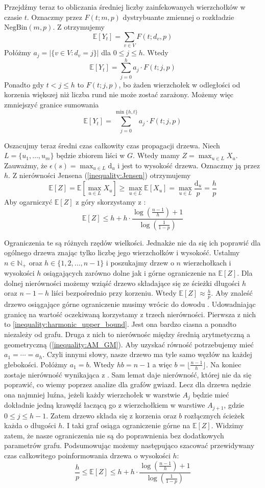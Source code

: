 Przejdźmy teraz to obliczania średniej liczby zainfekowanych wierzchołków w czasie $t$. Oznaczmy przez $F(t;m,p)$ dystrybuante zmiennej o rozkładzie $\mathrm{NegBin}(m,p)$. Z  otrzymujemy
\[
    \mathbb{E}[Y_t] = \sum_{v\in V} F(t; d_v, p)
\]
Połóżmy $a_j = |\{v\in V: d_v=j\}|$ dla $0\le j \le h$. Wtedy 
\[
    \mathbb{E}[Y_t] = \sum_{j=0}^{h} a_j\cdot F(t; j, p)
\]
Ponadto gdy $t<j\le h$ to $F(t; j, p)$, bo żaden wierzchołek w odległości od korzenia większej niż liczba rund nie może zostać zarażony. Możemy więc zmniejszyć granice sumowania 
\[
    \mathbb{E}[Y_t] = \sum_{j=0}^{\min\{h,t\}} a_j\cdot F(t; j, p)
\]

Oszacujmy teraz średni czas całkowity czas propagacji drzewa.
Niech $L=\{u_1,\dots, u_m\}$ będzie zbiorem liści w $G$. Wtedy mamy $Z = \max_{u\in L} X_{u}$.
Zauważmy, że $\epsilon(s) = \max_{u\in L} \mathrm{d}_{u}$ i jest to wysokość drzewa. Oznaczmy ją przez $h$. Z nierówności Jensena (\ref{inequality:Jensen}) otrzymujemy
\[
    \mathbb{E}[Z]=\mathbb{E}[\max_{u\in L} X_{u}] \ge \max_{u\in L} \mathbb{E}[X_{u}] = \max_{u\in L} \frac{\mathrm{d}_{u}}{p} = \frac{h}{p}
\]
Aby ogarniczyć $\mathbb{E}[Z]$ z góry skorzystamy z :
\[
    \mathbb{E}[Z] \le h  + h \cdot \frac{\log(\frac{n-1}{h}) + 1}{\log(\frac{1}{1-p})}
\]

Ograniczenia te są różnych rzędów wielkości. Jednakże nie da się ich poprawić dla ogólnego drzewa znając tylko liczbę jego wierzchołków i wysokość. Ustalmy $n\in\mathbb{N}_+$ oraz $h\in\{1,2,\dots,n-1\}$ i poszukajmy drzew o $n$ wierzchołkach i wysokości $h$ osiągających zarówno dolne jak i górne ograniczenie na $\mathbb{E}[Z]$. Dla dolnej nierówności możemy wziąść drzewo składające się ze ścieżki długości $h$ oraz $n-1-h$ liści bezpośrednio przy korzeniu. Wtedy $\mathbb{E}[Z] \approx \frac{h}{p}$. Aby znaleść drzewo osiągające górne ograniczenie musimy wrócic do dowodu . Udowadniając granicę na wartość oczekiwaną korzystamy z trzech nierówności. Pierwsza z nich to \cref{inequality:harmonic_upper_bound}. Jest ona bardzo ciasna a ponadto niezależy od grafu. Druga z nich to nierównośc między średnią arytmetyczną a geometryczną (\ref{inequality:AM_GM}). Aby uzyskać równość potrzebujemy mieć $a_1=\cdots=a_h$. Czyli innymi słowy, nasze drzewo ma tyle samo węzłów na każdej głebokości. Połóżmy $a_1=b$. Wtedy $hb=n-1$ a więc $b=\lfloor\frac{n-1}{h}\rfloor$. Na koniec zostaje nierówność wynikająca z . Sam lemat daje nierówność, której nie da się poprawić, co wiemy poprzez analize dla grafów gwiazd. Lecz dla drzewa nędzie ona najmniej luźna, jeżeli każdy wierzchołek w warstwie $A_j$ będzie mieć dokładnie jedną krawędź łaczącą go z wierzchołkiem w warstiwe $A_{j+1}$, gdzie $0\le j\le h-1$. Zatem drzewo składa się z korzenia oraz $b$ rozłącznych ścieżek każda o długości $h$. I taki graf osiąga ograniczenie górne na $\mathbb{E}[Z]$. Widzimy zatem, że nasze ograniczenia nie są do poprawnienia bez dodatkowych parametrów grafu. Podsumowując możemy następująco szacować przewidywany czas całkowitego poinformowania drzewa o wysokości $h$:
\[
    \frac{h}{p} \le \mathbb{E}[Z] \le h  + h \cdot \frac{\log(\frac{n-1}{h}) + 1}{\log(\frac{1}{1-p})}
\]